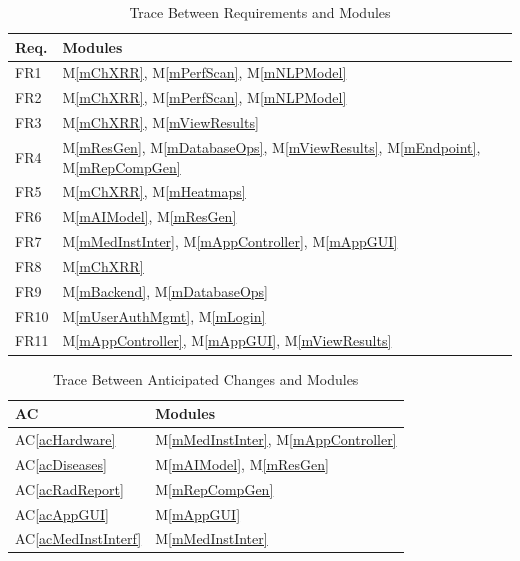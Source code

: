 \documentclass[12pt, titlepage]{article}
\newcommand{\acref}[1]{AC\ref{#1}}
\newcommand{\mref}[1]{M\ref{#1}}
\begin{document}
\begin{table}[H]
\centering
\begin{tabular}{p{} p{}}
\toprule
\textbf{Req.} & \textbf{Modules} \\
\midrule
FR1 & \mref{mChXRR}, \mref{mPerfScan}, \mref{mNLPModel} \\
FR2 & \mref{mChXRR}, \mref{mPerfScan}, \mref{mNLPModel} \\
FR3 & \mref{mChXRR}, \mref{mViewResults} \\
FR4 & \mref{mResGen}, \mref{mDatabaseOps}, \mref{mViewResults}, \mref{mEndpoint}, \mref{mRepCompGen} \\
FR5 & \mref{mChXRR}, \mref{mHeatmaps} \\
FR6 & \mref{mAIModel}, \mref{mResGen} \\
FR7 & \mref{mMedInstInter}, \mref{mAppController}, \mref{mAppGUI} \\
FR8 & \mref{mChXRR} \\
FR9 & \mref{mBackend}, \mref{mDatabaseOps} \\
FR10 & \mref{mUserAuthMgmt}, \mref{mLogin} \\
FR11 & \mref{mAppController}, \mref{mAppGUI}, \mref{mViewResults} \\
\bottomrule
\end{tabular}
\caption{Trace Between Requirements and Modules}
\label{TblRT}
\end{table}

\begin{table}[H]
\centering
\begin{tabular}{p{} p{}}
\toprule
\textbf{AC} & \textbf{Modules} \\
\midrule
\acref{acHardware} & \mref{mMedInstInter}, \mref{mAppController} \\
\acref{acDiseases} & \mref{mAIModel}, \mref{mResGen} \\
\acref{acRadReport} & \mref{mRepCompGen} \\
\acref{acAppGUI} & \mref{mAppGUI} \\
\acref{acMedInstInterf} & \mref{mMedInstInter} \\
\bottomrule
\end{tabular}
\caption{Trace Between Anticipated Changes and Modules}
\label{TblACT}
\end{table}
\end{document}
